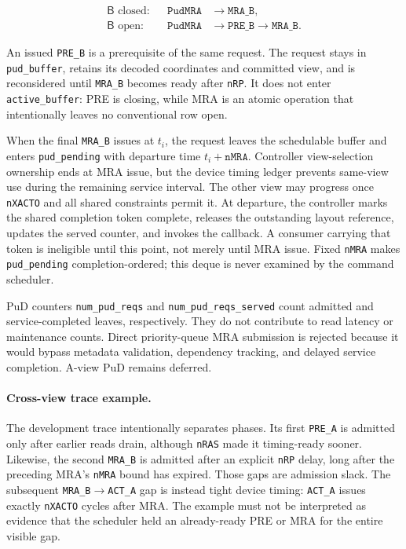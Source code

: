 \documentclass[9pt,twocolumn]{extarticle}
\newcommand{\cmd}[1]{\texttt{#1}}
\newcommand{\param}[1]{\texttt{#1}}
\newcommand{\viewB}{\textsf{B}}
\begin{document}
\begin{equation}
\begin{aligned}
  \viewB\text{ closed:} && \cmd{PudMRA} &\rightarrow \cmd{MRA\_B},\\
  \viewB\text{ open:}   && \cmd{PudMRA} &\rightarrow \cmd{PRE\_B}
      \rightarrow \cmd{MRA\_B}.
\end{aligned}
\end{equation}

An issued \cmd{PRE\_B} is a prerequisite of the same request. The request
stays in \cmd{pud\_buffer}, retains its decoded coordinates and committed
view, and is reconsidered until \cmd{MRA\_B} becomes ready after \param{nRP}.
It does not enter \cmd{active\_buffer}: PRE is closing, while MRA is an atomic
operation that intentionally leaves no conventional row open.

When the final \cmd{MRA\_B} issues at $t_i$, the request leaves the schedulable
buffer and enters \cmd{pud\_pending} with departure time
$t_i+\param{nMRA}$. Controller view-selection ownership ends at MRA issue, but
the device timing ledger prevents same-view use during the remaining service
interval. The other view may progress once \param{nXACTO} and all shared
constraints permit it. At departure, the controller marks the shared
completion token complete, releases the outstanding layout reference, updates
the served counter, and invokes the callback. A consumer carrying that token
is ineligible until this point, not merely until MRA issue. Fixed \param{nMRA}
makes \cmd{pud\_pending} completion-ordered; this deque is never examined by
the command scheduler.

PuD counters \cmd{num\_pud\_reqs} and \cmd{num\_pud\_reqs\_served} count
admitted and service-completed leaves, respectively. They do not contribute
to read latency or maintenance counts. Direct priority-queue MRA submission
is rejected because it would bypass metadata validation, dependency tracking,
and delayed service completion. A-view PuD remains deferred.

\paragraph{Cross-view trace example.}
The development trace intentionally separates phases. Its first
\cmd{PRE\_A} is admitted only after earlier reads drain, although
\param{nRAS} made it timing-ready sooner. Likewise, the second \cmd{MRA\_B}
is admitted after an explicit \param{nRP} delay, long after the preceding
MRA's \param{nMRA} bound has expired. Those gaps are admission slack. The
subsequent \cmd{MRA\_B}$\rightarrow$\cmd{ACT\_A} gap is instead tight device
timing: \cmd{ACT\_A} issues exactly \param{nXACTO} cycles after MRA. The
example must not be interpreted as evidence that the scheduler held an
already-ready PRE or MRA for the entire visible gap.
\end{document}

